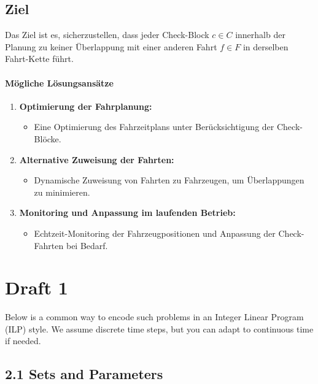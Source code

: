 \subsection*{Ziel}

Das Ziel ist es, sicherzustellen, dass jeder Check-Block $c \in C$ innerhalb der Planung zu keiner Überlappung mit einer anderen Fahrt $f \in F$ in derselben Fahrt-Kette führt.

\paragraph{Mögliche Lösungsansätze}

\begin{enumerate}
    \item \textbf{Optimierung der Fahrplanung:}
    \begin{itemize}
        \item Eine Optimierung des Fahrzeitplans unter Berücksichtigung der Check-Blöcke.
    \end{itemize}
    
    \item \textbf{Alternative Zuweisung der Fahrten:}
    \begin{itemize}
        \item Dynamische Zuweisung von Fahrten zu Fahrzeugen, um Überlappungen zu minimieren.
    \end{itemize}
    
    \item \textbf{Monitoring und Anpassung im laufenden Betrieb:}
    \begin{itemize}
        \item Echtzeit-Monitoring der Fahrzeugpositionen und Anpassung der Check-Fahrten bei Bedarf.
    \end{itemize}
    
\end{enumerate}
\section*{Draft 1}

Below is a common way to encode such problems in an Integer Linear Program (ILP) style. We assume discrete time steps, but you can adapt to continuous time if needed.

\subsection*{2.1 Sets and Parameters}

